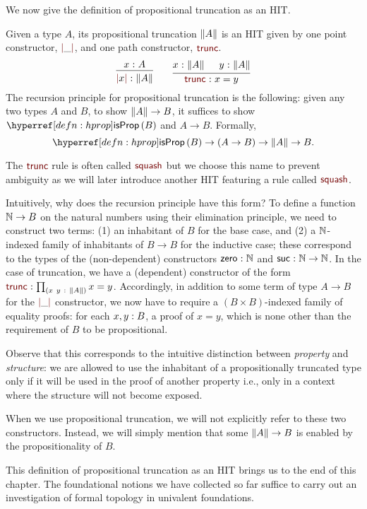 We now give the definition of propositional truncation as an HIT.
\begin{defn}\label{defn:truncation}
  Given a type $A$, its propositional truncation $\left\| A \right\|$ is an HIT given by one point
  constructor, $\rulename{|}\_\rulename{|}$, and one path constructor,
  $\rulename{trunc}$.
  \begin{equation*}
    \begin{prooftree}
      \hypo{\oftyI{x}{A}}
      \infer1{\oftyI{\rulename{|}x\rulename{|}}{\trunc{A}}}
    \end{prooftree}
    \qquad
    \begin{prooftree}
      \hypo{\oftyI{x}{\trunc{A}}}
      \hypo{\oftyI{y}{\trunc{A}}}
      \infer2{\oftyI{\rulename{trunc}}{x = y}}
    \end{prooftree}
  \end{equation*}
  The recursion principle for propositional truncation is the following: given any two
  types $A$ and $B$, to show $\left\| A \right\| \rightarrow B$, it suffices to show $\isprop{B}$ and $A \rightarrow
  B$. Formally,
  \begin{equation*}
    \isprop{B} \rightarrow (A \rightarrow B) \rightarrow \trunc{A} \rightarrow B.
  \end{equation*}
\end{defn}
The $\rulename{trunc}$ rule is often called $\rulename{squash}$ but we choose this name to
prevent ambiguity as we will later introduce another HIT featuring a rule called
$\rulename{squash}$.

Intuitively, why does the recursion principle have this form? To define a function
$\mathbb{N}{} \rightarrow B$ on the natural numbers using their elimination principle, we need to
construct two terms: (1) an inhabitant of $B$ for the base case, and (2) a
$\mathbb{N}{}$-indexed family of inhabitants of $B \rightarrow B$ for the inductive case; these
correspond to the types of the (non-dependent) constructors $\mathsf{zero}{}\hspace{0.1mm}:\hspace{0.1mm}\mathbb{N}{}$ and
$\mathsf{suc}{}\hspace{0.1mm}:\hspace{0.1mm}\mathbb{N}{} \rightarrow \mathbb{N}{}$. In the case of truncation, we have a (dependent)
constructor of the form $\oftyI{\rulename{trunc}}{\pity{x~y}{\trunc{A}}{x = y}}$.
Accordingly, in addition to some term of type $A \rightarrow B$ for the $\rulename{|}\_\rulename{|}$
constructor, we now have to require a $(B \times B)$-indexed family of equality proofs: for
each $x, y:B$, a proof of $x = y$, which is none other than the requirement of
$B$ to be propositional.

Observe that this corresponds to the intuitive distinction between \emph{property} and
\emph{structure}: we are allowed to use the inhabitant of a propositionally truncated type
only if it will be used in the proof of another property i.e., only in a context where the
structure will not become exposed.

When we use propositional truncation, we will not explicitly refer to these two
constructors. Instead, we will simply mention that some $\left\| A \right\| \rightarrow B$ is enabled by the
propositionality of $B$.

This definition of propositional truncation as an HIT brings us to the end of this
chapter. The foundational notions we have collected so far suffice to carry out an
investigation of formal topology in univalent foundations.

